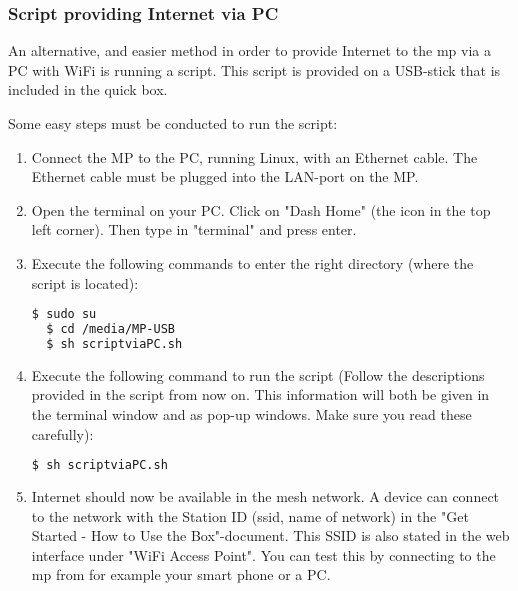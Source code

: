 \subsubsection{Script providing Internet via PC}

An alternative, and easier method in order to provide Internet to the \gls{mp} via a PC with WiFi is running a script. This script is provided on a USB-stick that is included in the \gls{quick} box. 

Some easy steps must be conducted to run the script:
\begin{enumerate}
\item Connect the MP to the PC, running Linux, with an Ethernet cable. The Ethernet cable must be plugged into the LAN-port on the MP. 
\item Open the terminal on your PC. Click on "Dash Home" (the icon in the top left corner). Then type in "terminal" and press enter. 
\item Execute the following commands to enter the right directory (where the script is located):
\noindent
\begin{lstlisting}[language=bash]
  $ sudo su
  $	cd /media/MP-USB
  $ sh scriptviaPC.sh
\end{lstlisting}
\item Execute the following command to run the script (Follow the descriptions provided in the script from now on. This information will both be given in the terminal window and as pop-up windows. Make sure you read these carefully):
\noindent
\begin{lstlisting}[language=bash]
  $ sh scriptviaPC.sh
\end{lstlisting}
\item Internet should now be available in the mesh network. A device can connect to the network with the Station ID (\gls{ssid}, name of network) in the "Get Started - How to Use the Box"-document. This SSID is also stated in the web interface under "WiFi Access Point". You can test this by connecting to the \gls{mp} from for example your smart phone or a PC.
\end{enumerate}